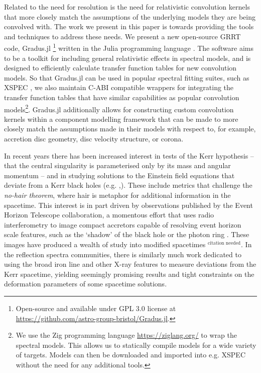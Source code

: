\documentclass[fleqn,usenatbib]{mnras}
\newcommand{\citneeded}{{\bf \color{red} $^{\text{citation needed}}$}}
\newcommand{\Gradus}{Gradus.jl }
\begin{document}
Related to the need for resolution is the need for relativistic convolution
kernels that more closely match the assumptions of the underlying models they
are being convolved with. The work we present in this paper is towards providing
the tools and techniques to address these needs. We present a new open-source
GRRT code, \Gradus\footnote{Open-source and available under GPL 3.0 license at
\url{https://github.com/astro-group-bristol/Gradus.jl}.} written in the Julia
programming language \citep{Bezanson_Julia_A_fresh_2017}. The software aims to
be a toolkit for including general relativistic effects in spectral models, and
is designed to efficiently calculate transfer function tables for new
convolution models. So that \Gradus can be used in popular spectral fitting
suites, such as XSPEC \citep{arnaud_xspec_1996}, we also maintain C-ABI
compatible wrappers for integrating the transfer function tables that have
similar capabilities as popular convolution models\footnote{We use the Zig
    programming language \url{https://ziglang.org/} to wrap the spectral models.
    This allows us to statically compile models for a wide variety of targets.
    Models can then be downloaded and imported into e.g. XSPEC without the need
    for any additional tools.}. \Gradus additionally allows for constructing
custom convolution kernels within a component modelling framework that can be
made to more closely match the assumptions made in their models with respect to,
for example, accretion disc geometry, disc velocity structure, or corona.

In recent years there has been increased interest in tests of the Kerr
hypothesis -- that the central singularity is parameterised only by its mass and
angular momentum -- and in studying solutions to the Einstein field equations
that deviate from a Kerr black holes (e.g. \citealt{johannsen_testing_2010,
chrusciel_stationary_2012, bambi_testing_2022, patra_accretion_2023,
chen_observational_2024},). These include metrics that challenge the
\textit{no-hair theorem}, where hair is metaphor for additional information in
the spacetime. This interest is in part driven by observations published by the
Event Horizon Telescope collaboration, a momentous effort that uses radio
interferometry to image compact accretors capable of resolving event horizon
scale features, such as the `shadow' of the black hole or the photon ring
\citep{the_event_horizon_telescope_collaboration_first_2019,
the_event_horizon_telescope_collaboration_first_2023}. These
images have produced a wealth of study into modified spacetimes\citneeded. In the
reflection spectra communities, there is similarly much work dedicated to using
the broad iron line and other X-ray features to measure deviations from the Kerr
spacetime, yielding seemingly promising results and tight constraints on the
deformation parameters of some spacetime solutions.
\end{document}
